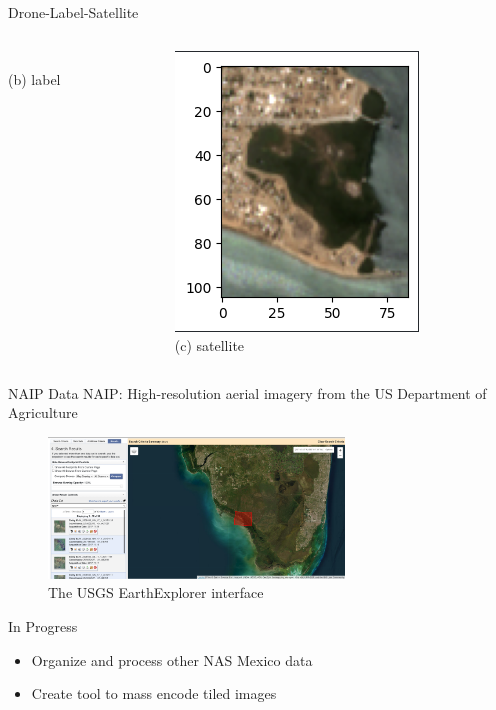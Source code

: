 \begin{frame}{Drone-Label-Satellite}
\begin{columns}[T]
\begin{column}{0.3\textwidth}
      \\
      {\small (b) label}
    \end{column}
    \begin{column}{0.3\textwidth}
      \centering
      \includegraphics[width=\linewidth,keepaspectratio]{images/mm_sat.png}
      \\
      {\small (c) satellite}
    \end{column}
  \end{columns}
\end{frame}

\begin{frame}{NAIP Data}
    NAIP: High-resolution aerial imagery from the US Department of Agriculture
    \centering
    \begin{figure}
        \includegraphics[height=0.7\textheight,width=0.7\textwidth,keepaspectratio]{images/earthexplorer.png}
        \caption{The USGS EarthExplorer interface}
    \end{figure}
\end{frame}

\begin{frame}{In Progress}
    \begin{itemize}
        \item Organize and process other NAS Mexico data
        \item Create tool to mass encode tiled images
    \end{itemize}    
\end{frame}

